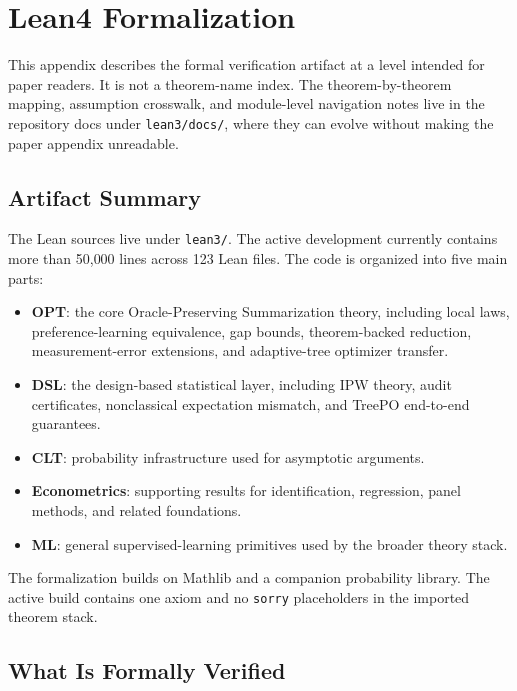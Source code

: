 \section{Lean4 Formalization}
\label{app:lean}

This appendix describes the formal verification artifact at a level intended for
paper readers. It is not a theorem-name index. The theorem-by-theorem mapping,
assumption crosswalk, and module-level navigation notes live in the repository
docs under \texttt{lean3/docs/}, where they can evolve without making the paper
appendix unreadable.

\subsection{Artifact Summary}

The Lean sources live under \texttt{lean3/}. The active development currently
contains more than 50{,}000 lines across 123 Lean files. The code is organized
into five main parts:
\begin{itemize}[nosep]
    \item \textbf{OPT}: the core Oracle-Preserving Summarization theory, including local laws, preference-learning equivalence, gap bounds, theorem-backed reduction, measurement-error extensions, and adaptive-tree optimizer transfer.
    \item \textbf{DSL}: the design-based statistical layer, including IPW theory, audit certificates, nonclassical expectation mismatch, and TreePO end-to-end guarantees.
    \item \textbf{CLT}: probability infrastructure used for asymptotic arguments.
    \item \textbf{Econometrics}: supporting results for identification, regression, panel methods, and related foundations.
    \item \textbf{ML}: general supervised-learning primitives used by the broader theory stack.
\end{itemize}

The formalization builds on Mathlib and a companion probability library. The
active build contains one axiom and no \texttt{sorry} placeholders in the
imported theorem stack.

\subsection{What Is Formally Verified}

